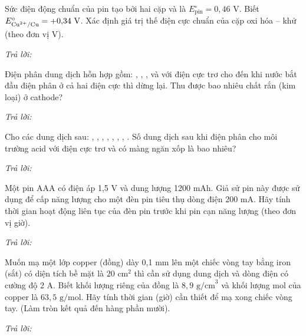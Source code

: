 \documentclass[11pt,a4paper]{article}
\def\loigiai#1{}
\begin{document}
\begin{ex}
Sức điện động chuẩn của pin tạo bởi hai cặp  và  là $E^\circ_{\text{pin}} = 0{,}46\text{ V}$. Biết $E^\circ_{\ce{Cu^2+/Cu}} = +0{,}34\text{ V}$. Xác định giá trị thế điện cực chuẩn của cặp oxi hóa – khử  (theo đơn vị V).
\par\noindent\textit{Trả lời:} \dotfill
\loigiai{}
\end{ex}

\begin{ex}
Điện phân dung dịch hỗn hợp gồm: , , ,  và  với điện cực trơ cho đến khi nước bắt đầu điện phân ở cả hai điện cực thì dừng lại. Thu được bao nhiêu chất rắn (kim loại) ở cathode?
\par\noindent\textit{Trả lời:} \dotfill
\loigiai{}
\end{ex}

\begin{ex}
Cho các dung dịch sau: , , , , , , , . Số dung dịch sau khi điện phân cho môi trường acid với điện cực trơ và có màng ngăn xốp là bao nhiêu?
\par\noindent\textit{Trả lời:} \dotfill
\loigiai{}
\end{ex}

\begin{ex}
Một pin AAA có điện áp 1,5 V và dung lượng 1200 mAh. Giả sử pin này được sử dụng để cấp năng lượng cho một đèn pin tiêu thụ dòng điện 200 mA. Hãy tính thời gian hoạt động liên tục của đèn pin trước khi pin cạn năng lượng (theo đơn vị giờ).
\par\noindent\textit{Trả lời:} \dotfill
\loigiai{}
\end{ex}

\begin{ex}
Muốn mạ một lớp copper (đồng) dày 0,1 mm lên một chiếc vòng tay bằng iron (sắt) có diện tích bề mặt là $20\text{ cm}^2$ thì cần sử dụng dung dịch  và dòng điện có cường độ 2 A. Biết khối lượng riêng của đồng là $8{,}9\text{ g/cm}^3$ và khối lượng mol của copper là $63{,}5\text{ g/mol}$. Hãy tính thời gian (giờ) cần thiết để mạ xong chiếc vòng tay. (Làm tròn kết quả đến hàng phần mười).
\par\noindent\textit{Trả lời:} \dotfill
\loigiai{}
\end{ex}


\end{document}
